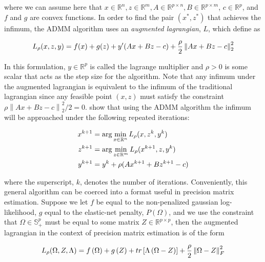 \documentclass[11pt,]{report}
\theoremstyle{definition}
\theoremstyle{definition}
\theoremstyle{definition}
\theoremstyle{remark}
\begin{document}
where we can assume here that \(x \in \mathbb{R}^{n}, z \in \mathbb{R}^{m}, A \in \mathbb{R}^{p \times n}, B \in \mathbb{R}^{p \times m}\), \(c \in \mathbb{R}^{p}\), and \(f\) and \(g\) are convex functions. In order to find the pair \((x^{*}, z^{*})\) that achieves the infimum, the ADMM algorithm uses an \emph{augmented lagrangian}, \(L\), which \citet{boyd2011distributed} define as

\begin{equation}
L_{\rho}(x, z, y) = f(x) + g(z) + y'(Ax + Bz - c) + \frac{\rho}{2}\left\| Ax + Bz - c \right\|_{2}^{2}
\label{eq:auglagrange}\notag
\end{equation}

In this formulation, \(y \in \mathbb{R}^{p}\) is called the lagrange multiplier and \(\rho > 0\) is some scalar that acts as the step size for the algorithm. Note that any infimum under the augmented lagrangian is equivalent to the infimum of the traditional lagrangian since any feasible point \((x, z)\) must satisfy the constraint \(\rho\left\| Ax + Bz - c \right\|_{2}^{2}/2 = 0\). \citet{boyd2011distributed} show that using the ADMM algorithm the infimum will be approached under the following repeated iterations:

\begin{equation}
\begin{split}
  x^{k + 1} &= \arg\min_{x \in \mathbb{R}^{n}}L_{\rho}(x, z^{k}, y^{k}) \\
  z^{k + 1} &= \arg\min_{z \in \mathbb{R}^{m}}L_{\rho}(x^{k + 1}, z, y^{k}) \\
  y^{k + 1} &= y^{k} + \rho(Ax^{k + 1} + Bz^{k + 1} - c)
\end{split}  
\label{eq:admmalgo}\notag
\end{equation}

where the superscript, \(k\), denotes the number of iterations. Conveniently, this general algorithm can be coerced into a format useful in precision matrix estimation. Suppose we let \(f\) be equal to the non-penalized gaussian log-likelihood, \(g\) equal to the elastic-net penalty, \(P\left( \Omega \right)\), and we use the constraint that \(\Omega \in \mathbb{S}_{+}^{p}\) must be equal to some matrix \(Z \in \mathbb{R}^{p \times p}\), then the augmented lagrangian in the context of precision matrix estimation is of the form

\begin{equation}
L_{\rho}(\Omega, Z, \Lambda) = f\left(\Omega\right) + g\left(Z\right) + tr\left[\Lambda\left(\Omega - Z\right)\right] + \frac{\rho}{2}\left\|\Omega - Z\right\|_{F}^{2}
\label{eq:auglagrange2}\notag
\end{equation}
\end{document}
